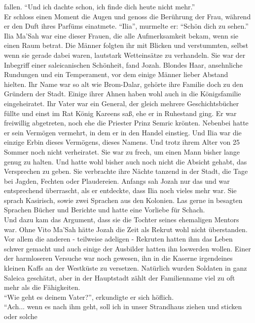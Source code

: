 fallen. ``Und ich dachte schon, ich finde dich heute nicht mehr.''\\
Er schloss einen Moment die Augen und genoss die Berührung der Frau, während er den Duft ihres 
Parfüms einatmete. ``Ilia'', murmelte er: ``Schön dich zu sehen.''\\
Ilia Ma'Sah war eine dieser Frauen, die alle Aufmerksamkeit bekam, wenn sie einen Raum betrat. Die 
Männer folgten ihr mit Blicken und verstummten, selbst wenn sie gerade dabei waren, lautstark 
Wetteinsätze zu verhandeln. Sie war der Inbegriff einer saleicanischen Schönheit, fand Jozah. 
Blondes Haar, ansehnliche Rundungen und ein Temperament, vor dem einige Männer lieber Abstand 
hielten. Ihr Name war so alt wie Brom-Dalar, gehörte ihre Familie doch zu den Gründern der Stadt. 
Einige ihrer Ahnen haben wohl auch in die Königsfamilie eingeheiratet. Ihr Vater war ein General, 
der gleich mehrere Geschichtsbücher füllte und einst im Rat König Kareens saß, ehe er in Ruhestand 
ging. Er war freiwillig abgetreten, noch ehe die Priester Prinz Semric krönten. Nebenbei hatte er 
sein Vermögen vermehrt, in dem er in den Handel einstieg. Und Ilia war die einzige Erbin dieses 
Vermögens, dieses Namens. Und trotz ihrem Alter von 25 Sommer noch nicht verheiratet. Sie war zu 
frech, um einen Mann bisher lange genug zu halten. Und hatte wohl bisher auch noch nicht die 
Absicht gehabt, das Versprechen zu geben. Sie verbrachte ihre Nächte tanzend in der Stadt, die Tage 
bei Jagden, Fechten oder Plaudereien. Anfangs sah Jozah nur das und war entsprechend überrascht, 
als er entdeckte, dass Ilia noch vieles mehr war. Sie sprach Kasirisch, sowie zwei Sprachen aus den 
Kolonien. Las gerne in besagten Sprachen Bücher und Berichte und hatte eine Vorliebe für Schach.\\
Und dazu kam das Argument, dass sie die Tochter seines ehemaligen Mentors war. Ohne Vito Ma'Sah 
hätte Jozah die Zeit als Rekrut wohl nicht überstanden. Vor allem die anderen - teilweise adeligen 
- Rekruten hatten ihm das Leben schwer gemacht und auch einige der Ausbilder hatten ihn loswerden 
wollen. Einer der harmloseren Versuche war noch gewesen, ihn in die Kaserne irgendeines kleinen 
Kaffs an der Westküste zu versetzen. Natürlich wurden Soldaten in ganz Saleica geschätzt, aber in 
der Hauptstadt zählt der Familienname viel zu oft mehr als die Fähigkeiten.\\
``Wie geht es deinem Vater?'', erkundigte er sich höflich.\\
``Ach... wenn es nach ihm geht, soll ich in unser Strandhaus ziehen und sticken oder solche 
